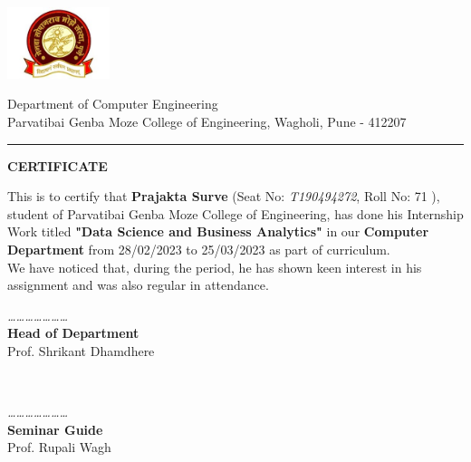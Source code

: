 \thispagestyle{plain}
\normalsize
\begin{multicols}{1}
 \flushleft
 \includegraphics[width=30mm]{Media/Logo/logo_utp.jpg}
 \columnbreak
 \par
 Department of Computer Engineering\\
 Parvatibai Genba Moze College of Engineering, Wagholi, Pune - 412207
\end{multicols}

\vspace{0.3\baselineskip}
\hrule
\vspace{1\baselineskip}

\begin{center}
{\Large {\bf \uppercase{Certificate}}}
\end{center}

\vspace{\baselineskip}
\justify
\noindent This is to certify that {\bf Prajakta Surve} (Seat No: {\textit{T190494272}}, Roll No: 71
), student of Parvatibai Genba Moze College of Engineering, has done his Internship Work titled {\bf "Data Science and Business Analytics"} in our {\bf Computer Department} from 28/02/2023 to 25/03/2023 as part of curriculum.\\
We have noticed that, during the period, he has shown keen interest in his assignment and was also regular in attendance.

\vspace{3\baselineskip}

\begin{minipage}{0.45\textwidth}
\begin{flushleft} \small
\emph{…………………}\\
\textbf{Head of Department}\\
Prof. Shrikant Dhamdhere \\[2.5cm]
\end{flushleft}

\end{minipage}
~
\begin{minipage}{0.45\textwidth}
\begin{flushright} \small
\emph{…………………}\\ 
\textbf{Seminar Guide}\\
Prof. Rupali Wagh\\[3.5cm]
\end{flushright}
\end{minipage}
\newpage